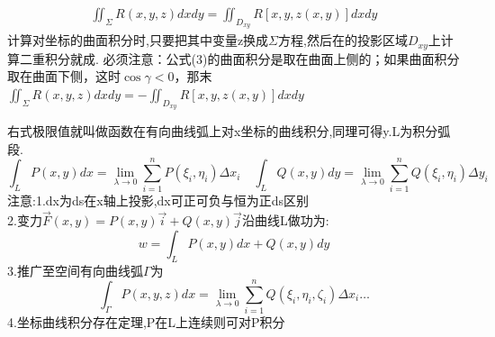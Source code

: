 \documentclass[10pt, a4paper, oneside]{ctexart}
\begin{document}
\begin{sloppypar}
	\begin{align}\label{eq3}
		\iint_\Sigma R(x,y,z)dxdy = \iint_{D_{xy}} R[x,y,z(x,y)]dxdy
	\end{align}
	计算对坐标的曲面积分时,只要把其中变量z换成$\Sigma$方程,然后在的投影区域$D_{xy}$上计算二重积分就成.
	必须注意：公式(3)的曲面积分是取在曲面上侧的；如果曲面积分取在曲面下侧，这时$\cos\gamma < 0$，那末$\iint_\Sigma R(x,y,z)dxdy = -\iint_{D_{xy}} R[x,y,z(x,y)]dxdy$

	右式极限值就叫做函数在有向曲线弧上对x坐标的曲线积分,同理可得y.L为积分弧段.
	$$
		\int_L P(x,y)dx=\lim_{\lambda\to 0}\sum_{i=1}^{n}P(\xi_i, \eta_i)\Delta x_i\quad \int_L Q(x,y)dy=\lim_{\lambda\to 0}\sum_{i=1}^{n}Q(\xi_i, \eta_i)\Delta y_i
	$$
	注意:1.dx为ds在x轴上投影,dx可正可负与恒为正ds区别\\
	2.变力$\overrightarrow{F}(x,y)=P(x,y)\overrightarrow{i}+Q(x,y)\overrightarrow{j}$沿曲线L做功为:$$w=\int_LP(x,y)dx + Q(x,y)dy$$3.推广至空间有向曲线弧$\Gamma$为$$
		\int_\Gamma P(x,y,z)dx=\lim_{\lambda\to 0}\sum_{i=1}^{n}Q(\xi_i, \eta_i, \zeta_i )\Delta x_i\ldots
	$$
	4.坐标曲线积分存在定理,P在L上连续则可对P积分


\end{sloppypar}
\end{document}
